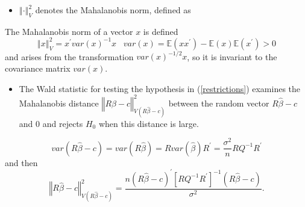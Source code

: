 \documentclass[notes=show]{beamer}
\begin{document}
\begin{frame}%


\begin{itemize}
\item $\left\Vert \cdot \right\Vert _{V}^{2}$ denotes the Mahalanobis norm,
defined as
\end{itemize}

\begin{definition}
The Mahalanobis norm of a vector $x$ is defined%
\begin{equation*}
\left\Vert x\right\Vert _{V}^{2}=x^{\prime }var\left( x\right)
^{-1}x\;\;\;var\left( x\right) =\mathbb{E}\left( xx^{\prime }\right) -%
\mathbb{E}\left( x\right) \mathbb{E}\left( x^{\prime }\right) >0
\end{equation*}%
and arises from the transformation $var\left( x\right) ^{-1/2}x$, so it is
invariant to the covariance matrix $var\left( x\right) $.
\end{definition}

\begin{itemize}
\item The Wald statistic for testing the hypothesis in (\ref{restrictions})
examines the Mahalanobis distance $\left\Vert R\hat{\beta}-c\right\Vert
_{V\left( R\hat{\beta}-c\right) }^{2}$ between the random vector $R\hat{\beta%
}-c$ and $0$ and rejects $H_{0}$ when this distance is large.
\end{itemize}

\end{frame}%

\begin{frame}%

\begin{equation*}
var\left( R\hat{\beta}-c\right) =var\left( R\hat{\beta}\right) =Rvar\left( 
\hat{\beta}\right) R^{\prime }=\frac{\sigma ^{2}}{n}RQ^{-1}R^{\prime }
\end{equation*}%
and then%
\begin{equation*}
\left\Vert R\hat{\beta}-c\right\Vert _{V\left( R\hat{\beta}-c\right) }^{2}=%
\frac{n\left( R\hat{\beta}-c\right) ^{\prime }\left[ RQ^{-1}R^{\prime }%
\right] ^{-1}\left( R\hat{\beta}-c\right) }{\sigma ^{2}}.
\end{equation*}

\end{frame}%
\end{document}
